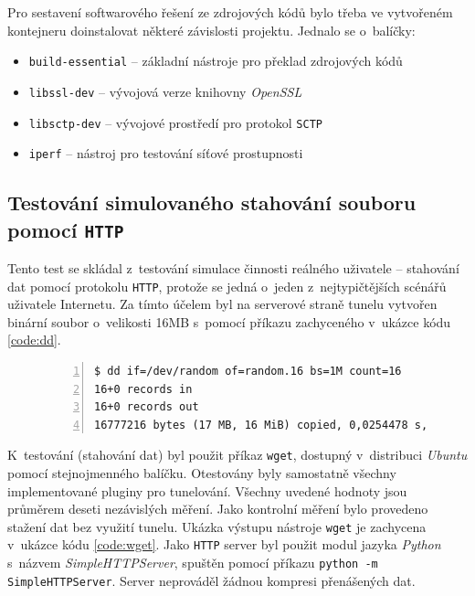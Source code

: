 \documentclass[thesis=M,czech]{FITthesis}[2012/10/20]
\begin{document}
Pro sestavení softwarového řešení ze zdrojových kódů bylo třeba ve vytvořeném kontejneru doinstalovat některé závislosti projektu. Jednalo se o~balíčky:
\begin{itemize}
 \item \texttt{build-essential} -- základní nástroje pro překlad zdrojových kódů
 \item \texttt{libssl-dev} -- vývojová verze knihovny \textit{OpenSSL}
 \item \texttt{libsctp-dev} -- vývojové prostředí pro protokol \texttt{SCTP}
 \item \texttt{iperf} -- nástroj pro testování síťové prostupnosti
\end{itemize}


\subsection{Testování simulovaného stahování souboru pomocí \texttt{HTTP}}
\label{test:http}

Tento test se skládal z~testování simulace činnosti reálného uživatele -- stahování dat pomocí protokolu \texttt{HTTP}, protože se jedná o~jeden z~nejtypičtějších scénářů uživatele Internetu. Za tímto účelem byl na serverové straně tunelu vytvořen binární soubor o~velikosti 16MB s~pomocí příkazu zachyceného v~ukázce kódu \ref{code:dd}.


    \begin{figure}[h]
	\begin{lstlisting}[label=code:dd,caption=Vytvoření souboru binárních dat za účelem testování přenosu pomocí \texttt{HTTP},frame=single,numbers=left]
$ dd if=/dev/random of=random.16 bs=1M count=16
16+0 records in
16+0 records out
16777216 bytes (17 MB, 16 MiB) copied, 0,0254478 s, 659 MB/s
      \end{lstlisting}
    \end{figure}

    K~testování (stahování dat) byl použit příkaz \texttt{wget}, dostupný v~distribuci \textit{Ubuntu} pomocí stejnojmenného balíčku. Otestovány byly samostatně všechny implementované pluginy pro tunelování. Všechny uvedené hodnoty jsou průměrem deseti nezávislých měření. Jako kontrolní měření bylo provedeno stažení dat bez využití tunelu. Ukázka výstupu nástroje \texttt{wget} je zachycena v~ukázce kódu \ref{code:wget}. Jako \texttt{HTTP} server byl použit modul jazyka \textit{Python} s~názvem \textit{SimpleHTTPServer}, spuštěn pomocí příkazu \texttt{python -m SimpleHTTPServer}. Server neprováděl žádnou kompresi přenášených dat.
    
\end{document}
